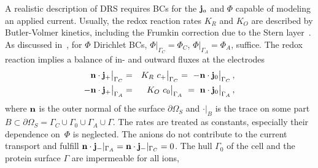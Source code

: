 \documentclass[runningheads]{lncse}
\newcommand{\mydiff}[2]{{}{#2}}
\begin{document}
A realistic description of 
DRS
requires BCs for the ${\bf j}_a$  and $\Phi$ capable of modeling an applied current. 
%
Usually, the redox reaction rates $K_R$ and $K_O$ are described by
Butler-Volmer kinetics, %
including the Frumkin correction
 due to the Stern layer~\cite{schmickler2010interfacial}.
% 
%
As discussed \mydiff{elsewhere}{in}~\cite{kramer2012cuda}, for $\Phi$ \mydiff{simple Dirichlet}{Dirichlet} BCs,
%
$\Phi\big|_{\Gamma_C} = \Phi_C$, %
$ \Phi\big|_{\Gamma_A}=\Phi_A $, suffice. %
%
The redox reaction implies a balance of \mydiff{inward}{in-} and outward fluxes
at the electrodes
%
\begin{eqnarray}
\label{DRS_FEM_BEM_wSciPAL-eq:currentcathodebc}
{\bf n} \cdot {\bf j}_+\big|_{\Gamma_C} & = &  K_R~c_+\big|_{\Gamma_C}   =~ -{\bf n}  \cdot {\bf j}_0\big|_{\Gamma_C} \,, \\
%
\label{DRS_FEM_BEM_wSciPAL-eq:currentanodebc}
 -  {\bf n} \cdot {\bf j}_+\big|_{\Gamma_A}
  & = & K_O ~ c_0\big|_{\Gamma_A} ~= ~{\bf n} \cdot {\bf j}_0\big|_{\Gamma_A} \,,
\end{eqnarray}
%
where ${\bf n}$ is the outer normal of the surface $\partial\Omega_S$
 and $\cdot |_{B}$ is the trace on some part $B\subset \partial \Omega_S = \Gamma_C \cup \Gamma_0 \cup \Gamma_A \cup \Gamma$.
%
The rates are treated as constants, especially \mydiff{the}{their} dependence on~$\Phi$ is neglected.
%
The anions do not contribute to the current transport and fulfill
%
$ {\bf n} \cdot{\bf j}_-|_{\Gamma_A} 
=
 {\bf n} \cdot{\bf j}_-|_{\Gamma_C} 
   =0 %
$.
%
The hull $\Gamma_0$ of the cell and the protein surface $\Gamma$ are impermeable for all ions,
%
\end{document}

